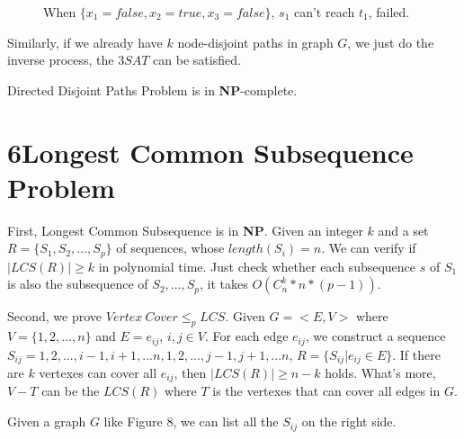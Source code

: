 \documentclass[a4paper,12pt]{article}
\begin{document}
\begin{figure}[!ht]
\caption{When $\{x_1=false,x_2=true,x_3=false\}$, $s_1$ can't reach $t_1$, failed.}
\end{figure}

Similarly, if we already have $k$ node-disjoint paths in graph $G$, we just do the inverse process, the $3SAT$ can be satisfied.

Directed Disjoint Paths Problem is in \textbf{NP}-complete.

\section*{6\quad Longest Common Subsequence Problem}

First, Longest Common Subsequence is in \textbf{NP}. Given an integer $k$ and a set $R=\{S_1,S_2,...,S_p\}$ of sequences, whose $length(S_i)=n$. We can verify if $|LCS(R)|\geq k$ in polynomial time. Just check whether each subsequence $s$ of $S_1$ is also the subsequence of $S_2,...,S_p$, it takes $O(C_n^k*n*(p-1))$.

Second, we prove $Vertex~Cover \leq_p LCS$. Given $G=<E,V>$ where $V=\{1,2,...,n\}$ and $E=e_{ij}$, $i,j\in V$. For each edge $e_{ij}$, we construct a sequence $S_{ij}=1,2,...,i-1,i+1,...n,1,2,...,j-1,j+1,...n$, $R=\{S_{ij}|e_{ij}\in E\}$. If there are $k$ vertexes can cover all $e_{ij}$, then $|LCS(R)|\geq n-k$ holds. What's more, $V-T$ can be the $LCS(R)$ where $T$ is the vertexes that can cover all edges in $G$.

Given a graph $G$ like Figure 8, we can list all the $S_{ij}$ on the right side.
\end{document}
